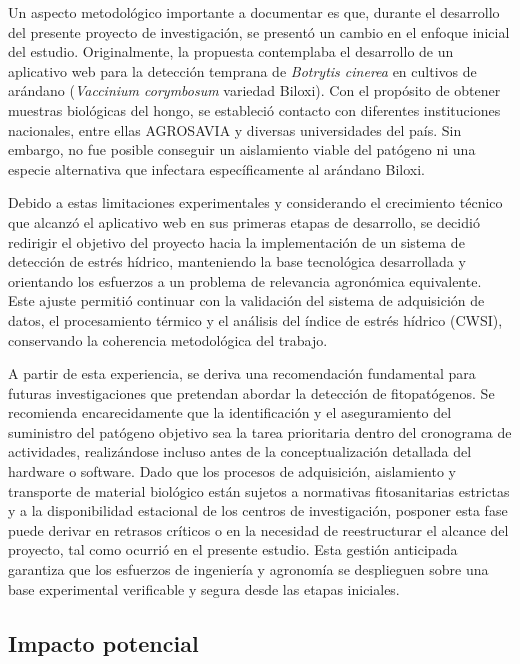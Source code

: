 Un aspecto metodológico importante a documentar es que, durante el desarrollo del presente proyecto de investigación, se presentó un cambio en el enfoque inicial del estudio. 
Originalmente, la propuesta contemplaba el desarrollo de un aplicativo web para la detección temprana de \textit{Botrytis cinerea} en cultivos de arándano (\textit{Vaccinium corymbosum} variedad Biloxi). Con el propósito de obtener muestras biológicas del hongo, se estableció contacto con diferentes instituciones nacionales, entre ellas AGROSAVIA y diversas universidades del país. Sin embargo, no fue posible conseguir un aislamiento viable del patógeno ni una especie alternativa que infectara específicamente al arándano Biloxi.

Debido a estas limitaciones experimentales y considerando el crecimiento técnico que alcanzó el aplicativo web en sus primeras etapas de desarrollo, se decidió redirigir el objetivo del proyecto hacia la implementación de un sistema de detección de estrés hídrico, manteniendo la base tecnológica desarrollada y orientando los esfuerzos a un problema de relevancia agronómica equivalente. Este ajuste permitió continuar con la validación del sistema de adquisición de datos, el procesamiento térmico y el análisis del índice de estrés hídrico (CWSI), conservando la coherencia metodológica del trabajo.

A partir de esta experiencia, se deriva una recomendación fundamental para futuras investigaciones que pretendan abordar la detección de fitopatógenos. Se recomienda encarecidamente que la identificación y el aseguramiento del suministro del patógeno objetivo sea la tarea prioritaria dentro del cronograma de actividades, realizándose incluso antes de la conceptualización detallada del hardware o software. Dado que los procesos de adquisición, aislamiento y transporte de material biológico están sujetos a normativas fitosanitarias estrictas y a la disponibilidad estacional de los centros de investigación, posponer esta fase puede derivar en retrasos críticos o en la necesidad de reestructurar el alcance del proyecto, tal como ocurrió en el presente estudio. Esta gestión anticipada garantiza que los esfuerzos de ingeniería y agronomía se desplieguen sobre una base experimental verificable y segura desde las etapas iniciales.

\subsection{Impacto potencial}
\label{subsec:impacto_potencial}


